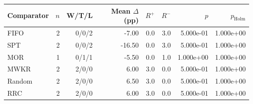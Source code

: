 \begin{tabular}{lrrrrrrr}
\toprule
Comparator & $n$ & W/T/L & Mean $\Delta$ (pp) & $R^+$ & $R^-$ & $p$ & $p_{\mathrm{Holm}}$ \\
\midrule
FIFO & 2 & 0/0/2 & -7.00 & 0.0 & 3.0 & 5.000e-01 & 1.000e+00 \\
SPT & 2 & 0/0/2 & -16.50 & 0.0 & 3.0 & 5.000e-01 & 1.000e+00 \\
MOR & 1 & 0/1/1 & -5.50 & 0.0 & 1.0 & 1.000e+00 & 1.000e+00 \\
MWKR & 2 & 2/0/0 & 6.00 & 3.0 & 0.0 & 5.000e-01 & 1.000e+00 \\
Random & 2 & 2/0/0 & 6.50 & 3.0 & 0.0 & 5.000e-01 & 1.000e+00 \\
RRC & 2 & 2/0/0 & 6.00 & 3.0 & 0.0 & 5.000e-01 & 1.000e+00 \\
\bottomrule
\end{tabular}
